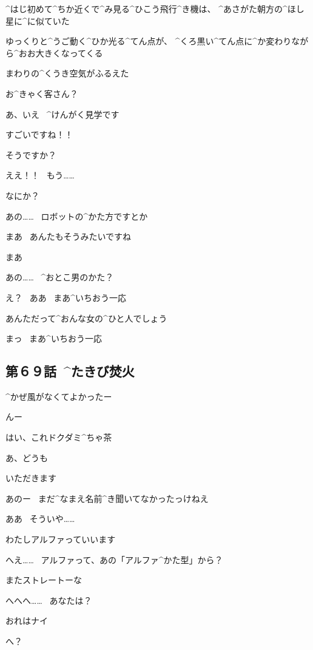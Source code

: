 \page[38]
\Alpha ^{はじ}{初}めて^{ちか}{近}くで^{み}{見}る^{ひこう}{飛行}^{き}{機}は、
^{あさがた}{朝方}の^{ほし}{星}に^{に}{似}ていた

\Alpha ゆっくりと^{うご}{動}く^{ひか}{光}る^{てん}{点}が、
^{くろ}{黒}い^{てん}{点}に^{か}{変}わりながら^{おお}{大}きくなってくる

\page[39]
\Alpha まわりの^{くうき}{空気}がふるえた

\page[42]
\Nai お^{きゃく}{客}さん？

\Alpha あ、いえ
\ ^{けんがく}{見学}です

\Alpha すごいですね！！

\Nai そうですか？

\Alpha ええ！！
\ もう……

\page[43]
\Nai なにか？

\Alpha あの……
\ ロボットの^{かた}{方}ですとか

\Nai まあ
\ あんたもそうみたいですね

\Alpha まあ

\page[44]
\Alpha あの……
\ ^{おとこ}{男}のかた？

\Nai え？
\ ああ
\ まあ^{いちおう}{一応}

\Nai あんただって^{おんな}{女}の^{ひと}{人}でしょう

\Alpha まっ
\ まあ^{いちおう}{一応}


\subsection{第６９話\ ^{たきび}{焚火}}

\page[46]
\Alpha ^{かぜ}{風}がなくてよかったー

\Nai んー

\Nai はい、これドクダミ^{ちゃ}{茶}

\Alpha あ、どうも

\Alpha いただきます

\page[47]
\Alpha あのー
\ まだ^{なまえ}{名前}^{き}{聞}いてなかったっけねえ

\Nai ああ
\ そういや……

\Alpha わたしアルファっていいます

\Nai へえ……
\ アルファって、あの「アルファ^{かた}{型}」から？

\Nai またストレートーな

\Alpha へへへ……
\ あなたは？

\page[48]
\Nai おれはナイ

\Alpha へ？

